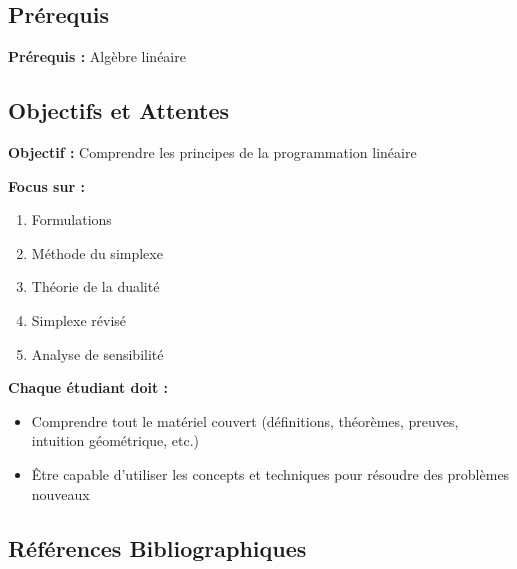 \documentclass[12pt,a4paper]{article}
\begin{document}
\subsection{Prérequis}

\begin{astuce}
\textbf{Prérequis :} Algèbre linéaire
\end{astuce}

\newpage
\subsection{Objectifs et Attentes}

\begin{important}
\textbf{Objectif :} Comprendre les principes de la programmation linéaire

\textbf{Focus sur :}
\begin{enumerate}
    \item \textcolor{titrebleu}{Formulations}
    \item \textcolor{defvert}{Méthode du simplexe}
    \item \textcolor{algoviolet}{Théorie de la dualité}
    \item \textcolor{exempleorange}{Simplexe révisé}
    \item \textcolor{importantrouge}{Analyse de sensibilité}
\end{enumerate}
\end{important}

\begin{astuce}
\textbf{Chaque étudiant doit :}
\begin{itemize}
    \item Comprendre tout le matériel couvert (définitions, théorèmes, preuves, intuition géométrique, etc.)
    \item Être capable d'utiliser les concepts et techniques pour résoudre des problèmes nouveaux
\end{itemize}
\end{astuce}

\subsection{Références Bibliographiques}
\end{document}
